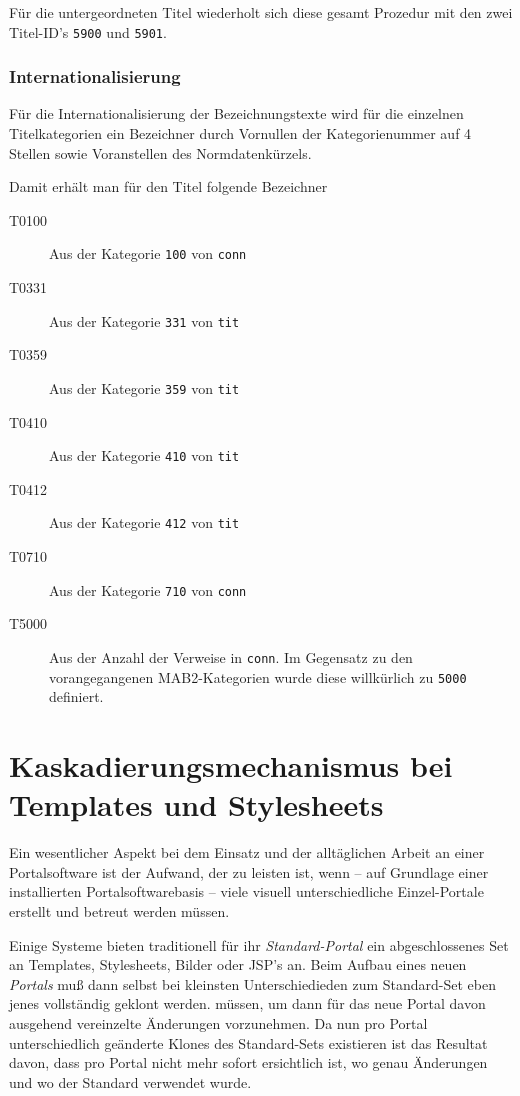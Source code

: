 \documentclass[11pt, twoside, a4paper, BCOR8mm, DIV12, bibtotoc,idxtotoc]{scrbook}
\begin{document}
Für die untergeordneten Titel wiederholt sich diese gesamt Prozedur
mit den zwei Titel-ID's \texttt{5900} und \texttt{5901}.

\subsubsection{Internationalisierung}

Für die Internationalisierung der Bezeichnungstexte wird für die
einzelnen Titelkategorien ein Bezeichner durch Vornullen der
Kategorienummer auf 4 Stellen sowie Voranstellen des Normdatenkürzels.

Damit erhält man für den Titel folgende Bezeichner

\begin{description}
\item[T0100] Aus der Kategorie \texttt{100} von \texttt{conn}
\item[T0331] Aus der Kategorie \texttt{331} von \texttt{tit}
\item[T0359] Aus der Kategorie \texttt{359} von \texttt{tit}
\item[T0410] Aus der Kategorie \texttt{410} von \texttt{tit}
\item[T0412] Aus der Kategorie \texttt{412} von \texttt{tit}
\item[T0710] Aus der Kategorie \texttt{710} von \texttt{conn}
\item[T5000] Aus der Anzahl der Verweise in \texttt{conn}. Im
  Gegensatz zu den vorangegangenen MAB2-Kategorien wurde diese
  willkürlich zu \texttt{5000} definiert.
\end{description}


\section{Kaskadierungsmechanismus bei Templates und Stylesheets}

Ein wesentlicher Aspekt bei dem Einsatz und der alltäglichen Arbeit an
einer Portalsoftware ist der Aufwand, der zu leisten ist, wenn -- auf
Grundlage einer installierten Portalsoftwarebasis -- viele visuell
unterschiedliche Einzel-Portale erstellt und betreut werden müssen.

Einige Systeme bieten traditionell für ihr \emph{Standard-Portal} ein
abgeschlossenes Set an Templates, Stylesheets, Bilder oder JSP's an.
Beim Aufbau eines neuen \emph{Portals} muß dann selbst bei kleinsten
Unterschiedieden zum Standard-Set eben jenes vollständig geklont
werden. müssen, um dann für das neue Portal davon ausgehend
vereinzelte Änderungen vorzunehmen. Da nun pro Portal unterschiedlich
geänderte Klones des Standard-Sets existieren ist das Resultat davon,
dass pro Portal nicht mehr sofort ersichtlich ist, wo genau Änderungen
und wo der Standard verwendet wurde.
\end{document}
